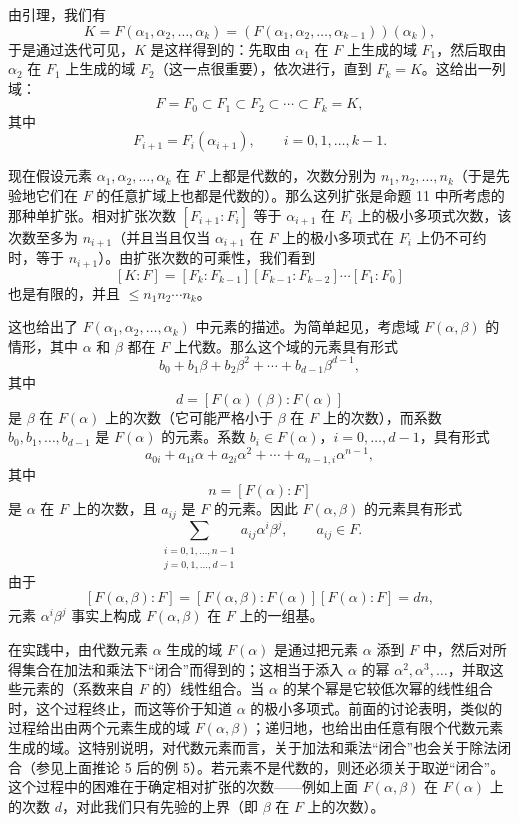 由引理，我们有
\[
K=F(\alpha_1,\alpha_2,\ldots,\alpha_k)
=(F(\alpha_1,\alpha_2,\ldots,\alpha_{k-1}))(\alpha_k),
\]
于是通过迭代可见，$K$ 是这样得到的：先取由 $\alpha_1$ 在 $F$ 上生成的域 $F_1$，然后取由 $\alpha_2$ 在 $F_1$ 上生成的域 $F_2$（这一点很重要），依次进行，直到 $F_k=K$。这给出一列域：
\[
F=F_0\subset F_1\subset F_2\subset \cdots\subset F_k=K,
\]
其中
\[
F_{i+1}=F_i(\alpha_{i+1}),\qquad i=0,1,\ldots,k-1.
\]

现在假设元素 $\alpha_1,\alpha_2,\ldots,\alpha_k$ 在 $F$ 上都是代数的，次数分别为 $n_1,n_2,\ldots,n_k$（于是先验地它们在 $F$ 的任意扩域上也都是代数的）。那么这列扩张是命题 11 中所考虑的那种单扩张。相对扩张次数 $[F_{i+1}:F_i]$ 等于 $\alpha_{i+1}$ 在 $F_i$ 上的极小多项式次数，该次数至多为 $n_{i+1}$（并且当且仅当 $\alpha_{i+1}$ 在 $F$ 上的极小多项式在 $F_i$ 上仍不可约时，等于 $n_{i+1}$）。由扩张次数的可乘性，我们看到
\[
[K:F]=[F_k:F_{k-1}][F_{k-1}:F_{k-2}]\cdots [F_1:F_0]
\]
也是有限的，并且 $\leq n_1n_2\cdots n_k$。

这也给出了 $F(\alpha_1,\alpha_2,\ldots,\alpha_k)$ 中元素的描述。为简单起见，考虑域 $F(\alpha,\beta)$ 的情形，其中 $\alpha$ 和 $\beta$ 都在 $F$ 上代数。那么这个域的元素具有形式
\[
b_0+b_1\beta+b_2\beta^2+\cdots+b_{d-1}\beta^{d-1},
\]
其中
\[
d=[F(\alpha)(\beta):F(\alpha)]
\]
是 $\beta$ 在 $F(\alpha)$ 上的次数（它可能严格小于 $\beta$ 在 $F$ 上的次数），而系数 $b_0,b_1,\ldots,b_{d-1}$ 是 $F(\alpha)$ 的元素。系数 $b_i\in F(\alpha)$，$i=0,\ldots,d-1$，具有形式
\[
a_{0i}+a_{1i}\alpha+a_{2i}\alpha^2+\cdots+a_{n-1,i}\alpha^{n-1},
\]
其中
\[
n=[F(\alpha):F]
\]
是 $\alpha$ 在 $F$ 上的次数，且 $a_{ij}$ 是 $F$ 的元素。因此 $F(\alpha,\beta)$ 的元素具有形式
\[
\sum_{\substack{i=0,1,\ldots,n-1\\ j=0,1,\ldots,d-1}} a_{ij}\alpha^i\beta^j,
\qquad a_{ij}\in F.
\]
由于
\[
[F(\alpha,\beta):F]=[F(\alpha,\beta):F(\alpha)][F(\alpha):F]=dn,
\]
元素 $\alpha^i\beta^j$ 事实上构成 $F(\alpha,\beta)$ 在 $F$ 上的一组基。

在实践中，由代数元素 $\alpha$ 生成的域 $F(\alpha)$ 是通过把元素 $\alpha$ 添到 $F$ 中，然后对所得集合在加法和乘法下“闭合”而得到的；这相当于添入 $\alpha$ 的幂 $\alpha^2,\alpha^3,
\ldots$，并取这些元素的（系数来自 $F$ 的）线性组合。当 $\alpha$ 的某个幂是它较低次幂的线性组合时，这个过程终止，而这等价于知道 $\alpha$ 的极小多项式。前面的讨论表明，类似的过程给出由两个元素生成的域 $F(\alpha,\beta)$；递归地，也给出由任意有限个代数元素生成的域。这特别说明，对代数元素而言，关于加法和乘法“闭合”也会关于除法闭合（参见上面推论 5 后的例 5）。若元素不是代数的，则还必须关于取逆“闭合”。这个过程中的困难在于确定相对扩张的次数——例如上面 $F(\alpha,\beta)$ 在 $F(\alpha)$ 上的次数 $d$，对此我们只有先验的上界（即 $\beta$ 在 $F$ 上的次数）。

